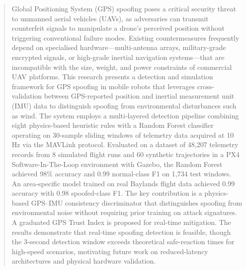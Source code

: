 \begin{abstract}
\noindent
Global Positioning System (GPS) spoofing poses a critical security threat to unmanned aerial vehicles (UAVs), as adversaries can transmit counterfeit signals to manipulate a drone's perceived position without triggering conventional failure modes. Existing countermeasures frequently depend on specialised hardware---multi-antenna arrays, military-grade encrypted signals, or high-grade inertial navigation systems---that are incompatible with the size, weight, and power constraints of commercial UAV platforms. This research presents a detection and simulation framework for GPS spoofing in mobile robots that leverages cross-validation between GPS-reported position and inertial measurement unit (IMU) data to distinguish spoofing from environmental disturbances such as wind. The system employs a multi-layered detection pipeline combining eight physics-based heuristic rules with a Random Forest classifier operating on 30-sample sliding windows of telemetry data acquired at 10\,Hz via the MAVLink protocol. Evaluated on a dataset of 48,207 telemetry records from 8 simulated flight runs and 60 synthetic trajectories in a PX4 Software-In-The-Loop environment with Gazebo, the Random Forest achieved 98\% accuracy and 0.99 normal-class F1 on 1,734 test windows. An area-specific model trained on real Baylands flight data achieved 0.99 accuracy with 0.98 spoofed-class F1. The key contribution is a physics-based GPS--IMU consistency discriminator that distinguishes spoofing from environmental noise without requiring prior training on attack signatures. A graduated GPS Trust Index is proposed for real-time mitigation. The results demonstrate that real-time spoofing detection is feasible, though the 3-second detection window exceeds theoretical safe-reaction times for high-speed scenarios, motivating future work on reduced-latency architectures and physical hardware validation.
\end{abstract}
